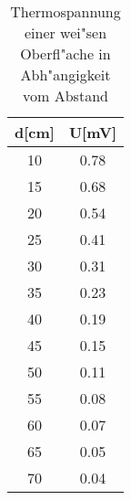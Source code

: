 \begin{table}
\begin{center}
\begin{tabular}{c|c}
d[cm] & U[mV] \\
\hline
10 & 0.78 \\
15 & 0.68 \\
20 & 0.54 \\
25 & 0.41 \\
30 & 0.31 \\
35 & 0.23 \\
40 & 0.19 \\
45 & 0.15 \\
50 & 0.11 \\
55 & 0.08 \\
60 & 0.07 \\
65 & 0.05 \\
70 & 0.04 \\
\end{tabular}
\caption[Thermospannung]{Thermospannung einer wei"sen Oberfl"ache in Abh"angigkeit vom Abstand}
\label{abstand}
\end{center}
\end{table}
